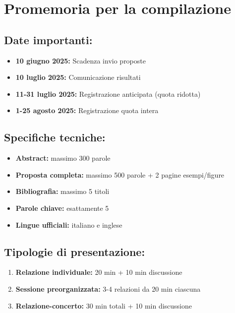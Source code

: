 \documentclass[12pt,a4paper]{article}
\begin{document}
\newpage

\section*{Promemoria per la compilazione}

\subsection*{Date importanti:}
\begin{itemize}
    \item \textbf{10 giugno 2025:} Scadenza invio proposte
    \item \textbf{10 luglio 2025:} Comunicazione risultati
    \item \textbf{11-31 luglio 2025:} Registrazione anticipata (quota ridotta)
    \item \textbf{1-25 agosto 2025:} Registrazione quota intera
\end{itemize}

\subsection*{Specifiche tecniche:}
\begin{itemize}
    \item \textbf{Abstract:} massimo 300 parole
    \item \textbf{Proposta completa:} massimo 500 parole + 2 pagine esempi/figure
    \item \textbf{Bibliografia:} massimo 5 titoli
    \item \textbf{Parole chiave:} esattamente 5
    \item \textbf{Lingue ufficiali:} italiano e inglese
\end{itemize}

\subsection*{Tipologie di presentazione:}
\begin{enumerate}
    \item \textbf{Relazione individuale:} 20 min + 10 min discussione
    \item \textbf{Sessione preorganizzata:} 3-4 relazioni da 20 min ciascuna
    \item \textbf{Relazione-concerto:} 30 min totali + 10 min discussione
\end{enumerate}
\end{document}
